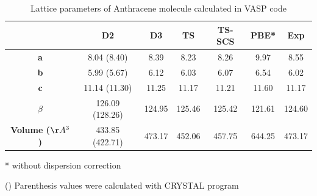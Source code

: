  	\begin{table}[htb]
 		\caption{Lattice parameters of Anthracene molecule calculated in VASP code} \label{table-Anthrasol}
 		\begin{center}
 			\begin{threeparttable}
 			\begin{tabular}{c c c c c c c}
 				\toprule
 				& \textbf{D2} & \textbf{D3} & \textbf{TS} & \textbf{TS-SCS} & \textbf{PBE*} & \textbf{Exp} \\
 				\midrule
 				\textbf{a} &8.04 (8.40) & 8.39 &8.23 & 8.26 & 9.97 &8.55 \\
 				\textbf{b}& 5.99 (5.67) & 6.12 & 6.03 & 6.07 & 6.54 & 6.02 \\
 				\textbf{c}& 11.14 (11.30) & 11.25 & 11.17 & 11.21 & 11.60 & 11.17 \\
 				\textbf{$\beta$} & 126.09 (128.26) & 124.95 & 125.46 & 125.42 & 121.61 & 124.60\\
 				\textbf{Volume ($\AA^{3}$)} & 433.85 (422.71) & 473.17 & 452.06 & 457.75 & 644.25 & 473.17\\
 				\bottomrule
 			\end{tabular}
 			
 			\begin{tablenotes}
 				\item[*] without dispersion correction
 				\item[()] Parenthesis values were calculated with CRYSTAL program
 			\end{tablenotes}
 		\end{threeparttable}
 		\end{center}
 	\end{table}
 	
